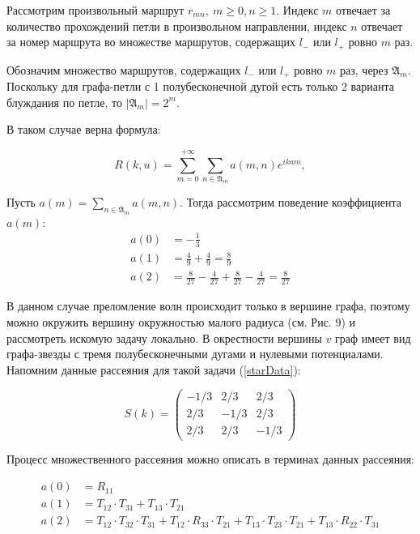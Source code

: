 \documentclass[a4 paper, 12 pt]{extarticle}
\begin{document}
   Рассмотрим произвольный маршрут $r_{mn}, \ m \geq 0, n \geq 1$.
   Индекс $m$ отвечает за количество прохождений петли в произвольном направлении, индекс $n$ отвечает за номер маршрута во множестве маршрутов, содержащих $l_-$ или $l_+$ ровно $m$ раз. 
   
   Обозначим множество маршрутов, содержащих $l_-$ или $l_+$ ровно $m$ раз, через $\mathfrak{A}_m$. Поскольку для графа-петли с 1 полубесконечной дугой есть только 2 варианта блуждания по петле, то $\left|\mathfrak{A}_m\right| = 2^m$.
   
   В таком случае верна формула:
   
   \begin{equation}
   \label{multiple}
   R\left(k,u\right) = \sum_{m = 0}^{+\infty} \sum_{n \in \mathfrak{A}_m} a\left(m,n\right)e^{ikam},
   \end{equation}

   Пусть $a\left(m\right) = \sum_{n \in \mathfrak{A}_m} a\left(m,n\right)$. Тогда рассмотрим поведение коэффициента $a\left(m\right)$:
   \[\begin{aligned}
   a(0) &= -\frac{1}{3} \\
   a(1) &= \frac{4}{9} + \frac{4}{9} = \frac{8}{9} \\
   a(2) &= \frac{8}{27} - \frac{4}{27} + \frac{8}{27} - \frac{4}{27} =  \frac{8}{27}
   \end{aligned}\]
   
   В данном случае преломление волн происходит только в вершине графа, поэтому можно окружить вершину окружностью малого радиуса (см. Рис. 9) и рассмотреть искомую задачу локально. В окрестности вершины $v$ граф имеет вид графа-звезды с тремя полубесконечными дугами и нулевыми потенциалами. Напомним данные рассеяния для такой задачи (\ref{starData}):
   
   \[
   S(k)=
   \begin{pmatrix}
   -1/3 & 2/3 & 2/3 \\
   2/3 & -1/3 & 2/3 \\
   2/3 & 2/3 & -1/3 
   \end{pmatrix}\]
   
   Процесс множественного рассеяния можно описать в терминах данных рассеяния:
   
   \[
   \begin{aligned}
   a(0) &= R_{11} \\
   a(1) &= T_{12}\cdot T_{31} + T_{13}\cdot T_{21} \\
   a(2) &= T_{12}\cdot T_{32}\cdot T_{31} + T_{12} \cdot R_{33} \cdot T_{21} + T_{13} \cdot T_{23} \cdot T_{21} + T_{13} \cdot R_{22} \cdot T_{31}
   \end{aligned}\]
   
\end{document}
